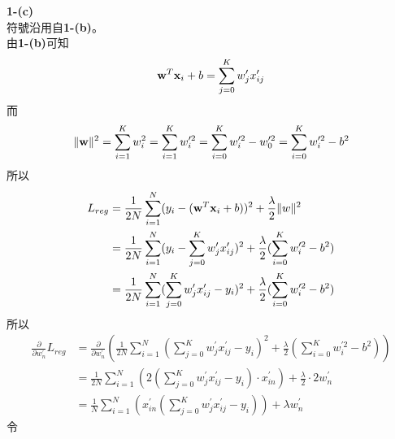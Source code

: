 \documentclass{article}
\begin{document}
\noindent
{\bf 1-(c)}\\

\noindent
符號沿用自{\bf 1-(b)}。\\
由{\bf 1-(b)}可知
\begin{align*}
    {\bf w}^T{\bf x}_i + b = \sum_{j = 0}^{K} w_j^\prime x_{ij}^\prime
\end{align*}
而
\begin{align*}
    \lVert {\bf w} \rVert ^2 = \sum_{i = 1}^{K} w_i^2 = \sum_{i = 1}^{K} w_i^{\prime 2} = \sum_{i = 0}^{K} w_{i}^{\prime 2} - w_0^{\prime 2} = \sum_{i = 0}^{K} w_i^{\prime 2} - b^2
\end{align*}
所以
\begin{align*}
    L_{reg} &= \frac{1}{2N} \sum_{i = 1}^{N} (y_i - ({\bf w}^T {\bf x}_i + b))^2 + \frac{\lambda}{2} \lVert w \rVert ^2\\
    &= \frac{1}{2N} \sum_{i = 1}^{N} (y_i - \sum_{j = 0}^{K} w_j^\prime x_{ij}^\prime)^2 + \frac{\lambda}{2} (\sum_{i = 0}^{K} w_i^{\prime 2} - b^2)\\
    &= \frac{1}{2N} \sum_{i = 1}^{N} (\sum_{j = 0}^{K} w_j^\prime x_{ij}^\prime - y_i)^2 + \frac{\lambda}{2} (\sum_{i = 0}^{K} w_i^{\prime 2} - b^2)
\end{align*}
所以
\begin{align*}
    \frac{\partial}{\partial w_n^\prime} L_{reg} &= \frac{\partial}{\partial w_n^\prime} (\frac{1}{2N} \sum_{i = 1}^{N} (\sum_{j = 0}^{K} w_j^\prime x_{ij}^\prime - y_i)^2 + \frac{\lambda}{2} (\sum_{i = 0}^{K} w_i^{\prime 2} - b^2))\\
    &= \frac{1}{2N} \sum_{i = 1}^{N} (2(\sum_{j = 0}^{K} w_j^\prime x_{ij}^\prime - y_i) \cdot x_{in}^\prime) + \frac{\lambda}{2} \cdot 2w_n^\prime\\
    &= \frac{1}{N} \sum_{i = 1}^{N} (x_{in}^\prime(\sum_{j = 0}^{K} w_j^\prime x_{ij}^\prime - y_i)) + \lambda w_n^\prime
\end{align*}
令
\end{document}
